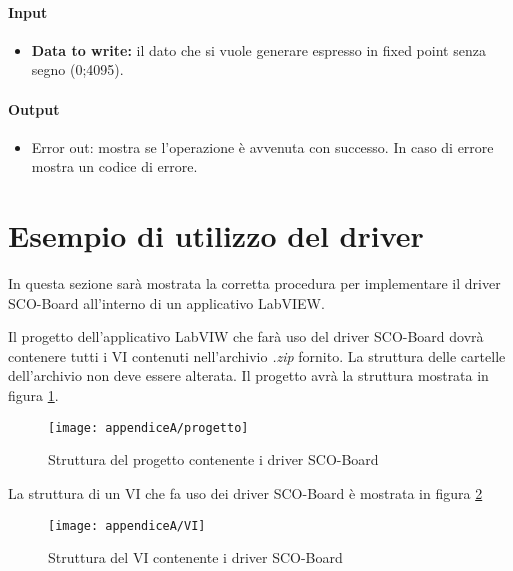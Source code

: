 \paragraph*{Input}
\begin{itemize}
	\item \textbf{Data to write:} il dato che si vuole generare espresso in fixed point senza segno (0;4095).
\end{itemize}

\paragraph*{Output}
\begin{itemize}
	\item Error out: mostra se l'operazione è avvenuta con successo. In caso di errore mostra un codice di errore.
\end{itemize}

\section*{Esempio di utilizzo del driver}
In questa sezione sarà mostrata la corretta procedura per implementare il driver SCO-Board all'interno di un applicativo LabVIEW.

Il progetto dell'applicativo LabVIW che farà uso del driver SCO-Board dovrà contenere tutti i VI contenuti nell'archivio \textit{.zip} fornito. La struttura delle cartelle dell'archivio non deve essere alterata.
Il progetto avrà la struttura mostrata in figura \ref{progetto}.

\begin{figure}[H]
	\begin{center}
		\texttt{[image: appendiceA/progetto]}
		\caption{Struttura del progetto contenente i driver SCO-Board}
		\label{progetto}
	\end{center}
\end{figure}

La struttura di un VI che fa uso dei driver SCO-Board è mostrata in figura \ref{VI}

\begin{figure}[H]
	\begin{center}
		\texttt{[image: appendiceA/VI]}
		\caption{Struttura del VI contenente i driver SCO-Board}
		\label{VI}
	\end{center}
\end{figure}

